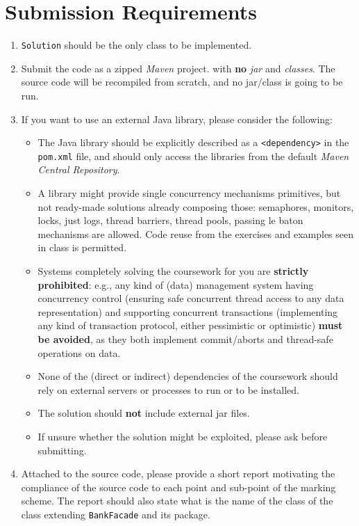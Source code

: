 \documentclass{article}
\begin{document}
	\section*{Submission Requirements}
	\begin{enumerate}
		\item \texttt{Solution} should be the only class to be implemented.
		\item Submit the code as a zipped \textit{Maven} project. with \textbf{no} \textit{jar} and \textit{classes}. The source code will be recompiled from scratch, and no jar/class is going to be run.
		 
		\item If you want to use an external Java library, please consider the following:
		\begin{itemize}
			\item The Java library should be explicitly described as a \texttt{<dependency>} in the \texttt{pom.xml} file, and should only access the libraries from the default \textit{Maven Central Repository}.
			\item A library might provide single concurrency mechanisms primitives, but not ready-made solutions already composing those: semaphores, monitors, locks, just logs, thread barriers, thread pools, passing le baton mechanisms are allowed. Code reuse from the exercises and examples seen in class is permitted.
			
			\item Systems completely solving the coursework for you are \textbf{strictly prohibited}: e.g., any kind of (data) management system having concurrency control (ensuring safe concurrent thread access to any data representation) and supporting concurrent transactions (implementing any kind of transaction protocol, either pessimistic or optimistic) \textbf{must be avoided}, as they both implement commit/aborts and thread-safe operations on data. 
			\item None of the (direct or indirect) dependencies of the coursework should rely on external servers or processes to run or to be installed.
			\item The solution should \textbf{not} include external jar files.
			\item If unsure whether the solution might be exploited, please ask before submitting.
		\end{itemize}
		 
		\item Attached to the source code, please provide a short report motivating the compliance of the source code to each point and sub-point of the marking scheme. The report should also state what is the name of the class of the class extending \texttt{BankFacade} and its package.
		
%		

	\end{enumerate}
\end{document}
